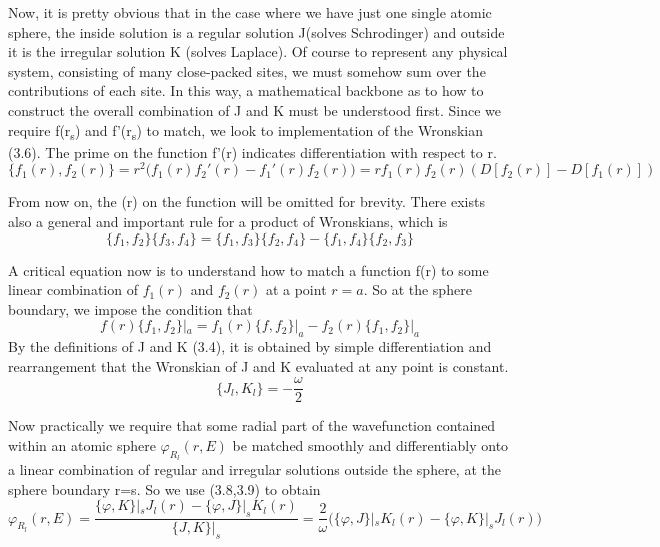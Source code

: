 \documentclass[12pt]{article}
\begin{document}
Now, it is pretty obvious that in the case where we have just one single atomic sphere, the inside solution is a regular solution J(solves Schrodinger) and outside it is the irregular solution K (solves Laplace). 
Of course to represent any physical system, consisting of many close-packed sites, we must somehow sum over the contributions of each site. In this way, a mathematical backbone as to how to construct the overall combination of J and K must be understood first.
Since we require f(r\textsubscript{s}) and f'(r\textsubscript{s}) to match, we look to implementation of the Wronskian (3.6). The prime on the function f'(r) indicates differentiation with respect to r.
\begin{equation} \label{3.6} \tag{3.6}
\{f_1(r),f_2(r)\}= r^2 \big(f_1(r)f_2'(r)-f_1'(r)f_2(r)\big)=rf_1(r)f_2(r) (D[f_2(r)]-D[f_1(r)])
\end{equation}

From now on, the (r) on the function will be omitted for brevity. There exists also a general and important rule for a product of Wronskians, which is 
\begin{equation} \label{3.7} \tag{3.7}
\{f_1,f_2\}\{f_3,f_4\}=\{f_1,f_3\}\{f_2,f_4\}-\{f_1,f_4\}\{f_2,f_3\}
\end{equation}

A critical equation now is to understand how to match a function f(r) to some linear combination of $f_1(r)$ and $f_2(r)$ at a point $r=a$. So at the sphere boundary, we impose the condition that
\begin{equation} \label{3.8} \tag{3.8}
f(r)\{f_1,f_2\}|_{a}=f_1(r)\{f,f_2\}|_{a}-f_2(r)\{f_1,f_2\}|_{a}
\end{equation}
By the definitions of J and K (3.4), it is obtained by simple differentiation and rearrangement that the Wronskian of J and K evaluated at any point is constant.
\begin{equation} \label{3.9} \tag{3.9}
\{J_l,K_l\}=-\frac{\omega}{2}
\end{equation}

Now practically we require that some radial part of the wavefunction contained within an atomic sphere $\varphi_R_l(r,E)$ be matched smoothly and differentiably onto a linear combination of regular and irregular solutions outside the sphere, at the sphere boundary r=s. So we use (3.8,3.9) to obtain
\begin{equation} \label{3.10} \tag{3.10}
\varphi_R_l(r,E)=\frac{\{\varphi,K\}|_{s}J_l(r)-\{\varphi,J\}|_{s}K_l(r)}{\{J,K\}|_{s}}=\frac{2}{\omega}\bigg(\{\varphi,J\}|_{s}K_l(r)-\{\varphi,K\}|_{s}J_l(r)\bigg)
\end{equation}
\end{document}
